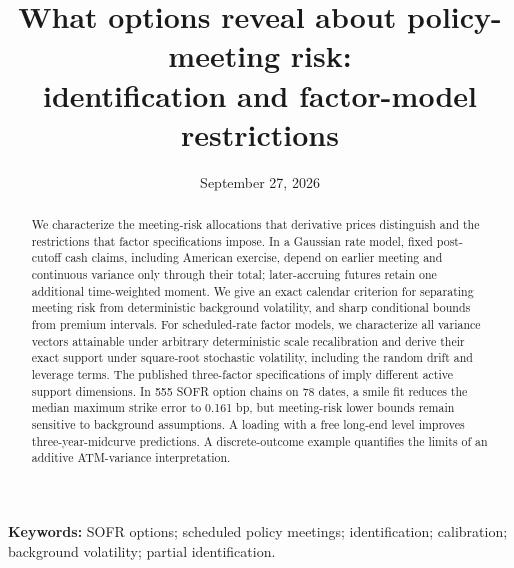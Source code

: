 \documentclass[11pt]{article}
\title{What options reveal about policy-meeting risk:\\ identification and factor-model restrictions}
\date{September 27, 2026}
\numberwithin{equation}{section}
\theoremstyle{remark}
\begin{document}
\maketitle
\begin{abstract}
We characterize the meeting-risk allocations that derivative prices distinguish and the restrictions that factor specifications impose. In a Gaussian rate model, fixed post-cutoff cash claims, including American exercise, depend on earlier meeting and continuous variance only through their total; later-accruing futures retain one additional time-weighted moment. We give an exact calendar criterion for separating meeting risk from deterministic background volatility, and sharp conditional bounds from premium intervals. For scheduled-rate factor models, we characterize all variance vectors attainable under arbitrary deterministic scale recalibration and derive their exact support under square-root stochastic volatility, including the random drift and leverage terms. The published three-factor specifications of \citet{brace2024sofr} imply different active support dimensions. In 555 SOFR option chains on 78 dates, a smile fit reduces the median maximum strike error to 0.161 bp, but meeting-risk lower bounds remain sensitive to background assumptions. A loading with a free long-end level improves three-year-midcurve predictions. A discrete-outcome example quantifies the limits of an additive ATM-variance interpretation.
\end{abstract}
\noindent\textbf{Keywords:} SOFR options; scheduled policy meetings; identification; calibration; background volatility; partial identification.









\FloatBarrier

\FloatBarrier

\appendix








\end{document}
